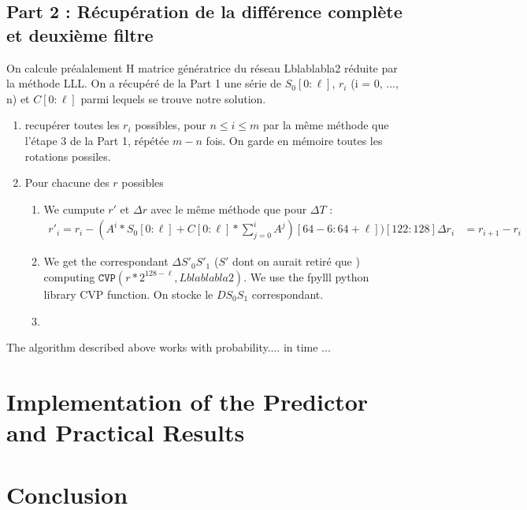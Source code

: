 \documentclass[preprint]{iacrtrans}
\begin{document}
\subsection{Part 2 : Récupération de la différence complète et deuxième filtre}
On calcule préalalement H matrice génératrice du réseau Lblablabla2 réduite par la méthode LLL.
On a récupéré de la Part 1 une série de $S_0[0 : \ell]$, $r_i$ (i = 0, ..., n) et $C[0 : \ell]$ parmi lequels se trouve notre solution.
\begin{enumerate}
  \item recupérer toutes les $r_i$ possibles, pour $n \leq i \leq m$  par la même méthode que l'étape 3 de la Part 1, répétée $m-n$ fois. On garde en mémoire toutes les rotations possiles.
  \item Pour chacune des $r$ possibles
  \begin{enumerate}
    \item We cumpute $r'$ et $\Delta r$ avec le même méthode que pour $\Delta T$ : 
    \begin{align}
      r'_i = r_i - (A^i*S_0[0 : \ell] + C[0 : \ell] * \sum_{j = 0}^i A^j)[64 - 6 : 64 + \ell])[122 : 128]
      \Delta r_i &= r_{i+1} - r_i
    \end{align}
    \item We get the correspondant $\Delta S'_0S'_1$ ($S'$ dont on aurait retiré que ) computing $\texttt{CVP}(r * 2^{128 - \ell}, Lblablabla2)$. We use the fpylll python library CVP function. On stocke le $DS_0S_1$ correspondant.

    \item 
  \end{enumerate}
\end{enumerate}

\begin{theorem}
  The algorithm described above works with probability.... in time ...
\end{theorem}

\section{Implementation of the Predictor and Practical Results}

\section{Conclusion}




\end{document}
